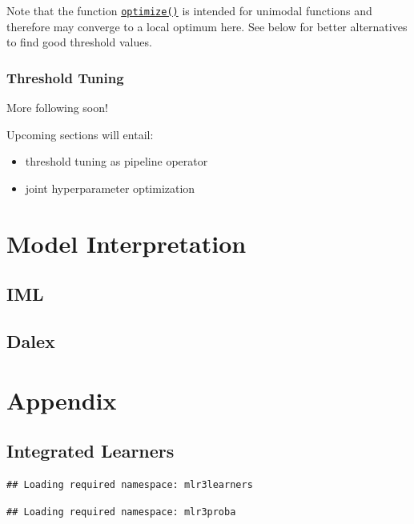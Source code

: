 \documentclass[]{scrbook}
\providecommand{\tightlist}{%
  \setlength{\itemsep}{0pt}\setlength{\parskip}{0pt}}
\begin{document}
Note that the function \href{https://www.rdocumentation.org/packages/stats/topics/optimize}{\texttt{optimize()}} is intended for unimodal functions and therefore may converge to a local optimum here.
See below for better alternatives to find good threshold values.

\hypertarget{threshold-tuning-1}{%
\subsection{Threshold Tuning}\label{threshold-tuning-1}}

More following soon!

Upcoming sections will entail:

\begin{itemize}
\tightlist
\item
  threshold tuning as pipeline operator
\item
  joint hyperparameter optimization
\end{itemize}

\hypertarget{interpretation}{%
\chapter{Model Interpretation}\label{interpretation}}

\hypertarget{iml}{%
\section{IML}\label{iml}}

\hypertarget{dalex}{%
\section{Dalex}\label{dalex}}

\hypertarget{appendix}{%
\chapter{Appendix}\label{appendix}}

\hypertarget{list-learners}{%
\section{Integrated Learners}\label{list-learners}}

\begin{verbatim}
## Loading required namespace: mlr3learners
\end{verbatim}

\begin{verbatim}
## Loading required namespace: mlr3proba
\end{verbatim}
\end{document}
